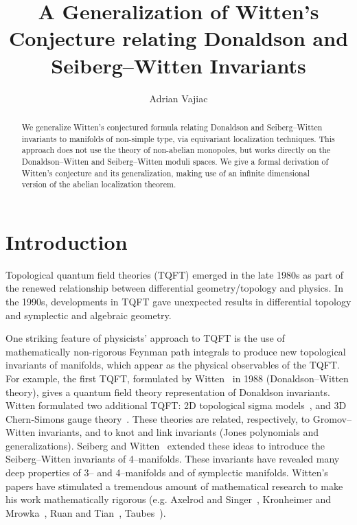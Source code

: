 \documentclass[a4paper,12pt,reqno,sumlimits]{amsart}
\theoremstyle{plain}
\theoremstyle{definition}
\newcommand{\1}{{\bf 1}}
\numberwithin{equation}{section}
\begin{document}
\title[A Generalization of Witten's Conjecture]{A Generalization of Witten's
  Conjecture relating Donaldson and Seiberg--Witten Invariants}
\author{Adrian Vajiac}
\address{Department of Mathematics\\
  University of Texas at Austin}
\begin{abstract}
  We generalize Witten's conjectured formula relating Donaldson and
  Seiberg--Witten invariants to manifolds of non-simple type, via equivariant
  localization techniques. This approach does not use the theory of
  non-abelian monopoles, but works directly on the Donaldson--Witten and
  Seiberg--Witten moduli spaces.  We give a formal derivation of Witten's
  conjecture and its generalization, making use of an infinite dimensional
  version of the abelian localization theorem.
\end{abstract}


\maketitle



\section{Introduction}
\label{intro}

Topological quantum field theories (TQFT) emerged in the late 1980s as part
of the renewed relationship between differential geometry/topology and
physics.  In the 1990s, developments in TQFT gave unexpected results in
differential topology and symplectic and algebraic geometry.

One striking feature of physicists' approach to TQFT is the use of
mathematically non-rigorous Feynman path integrals to produce new topological
invariants of manifolds, which appear as the physical observables of the
TQFT.  For example, the first TQFT, formulated by Witten~\cite{ewdon} in 1988
(Donaldson--Witten theory), gives a quantum field theory representation of
Donaldson invariants.  Witten formulated two additional TQFT: 2D topological
sigma models~\cite{ewsig}, and 3D Chern-Simons gauge theory~\cite{ewdon}.
These theories are related, respectively, to Gromov--Witten invariants, and
to knot and link invariants (Jones polynomials and generalizations).  Seiberg
and Witten~\cite{nsew} extended these ideas to introduce the Seiberg--Witten
invariants of 4--manifolds. These invariants have revealed many deep
properties of 3-- and 4--manifolds and of symplectic manifolds.  Witten's
papers have stimulated a tremendous amount of mathematical research to make
his work mathematically rigorous (e.g. Axelrod and Singer~\cite{axsinger},
Kronheimer and Mrowka~\cite{km1}, Ruan and Tian~\cite{ruantian},
Taubes~\cite{taubes}).
\end{document}
